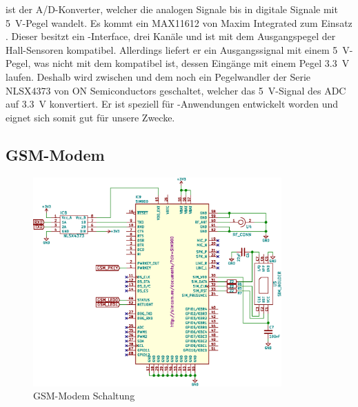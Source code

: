    ist    der   A/D-Konverter,   welcher   die    analogen   Signale
 bis  in  digitale Signale mit \SI{5}{\volt}-Pegel
wandelt. Es   kommt   ein   MAX11612   von  Maxim   Integrated   zum   Einsatz
\cite{datasheet:adc}. Dieser besitzt ein \ISC-Interface, drei Kan\"ale und ist
mit  dem  Ausgangspegel  der  Hall-Sensoren  kompatibel.   Allerdings  liefert
er  ein  Ausgangssignal  mit  einem \SI{5}{\volt}-Pegel,  was  nicht  mit  dem
\Raspi  kompatibel  ist, dessen  Eing\"ange  mit  einem Pegel  \SI{3.3}{\volt}
laufen. Deshalb wird zwischen  und  dem \Raspi noch ein Pegelwandler
der   Serie   NLSX4373  von   ON   Semiconductors   geschaltet,  welcher   das
\SI{5}{\volt}-Signal des ADC auf  \SI{3.3}{\volt} konvertiert. Er ist speziell
f\"ur  \ISC-Anwendungen entwickelt  worden  und eignet  sich  somit gut  f\"ur
unsere Zwecke.


\clearpage
\subsection{GSM-Modem}
\label{subsec:hw:master:gsm}

\begin{figure}[h!t]
    \centering
    \includegraphics[width=0.85\textwidth]{images/superv-sch/supervisor--sch--gsm.eps}
    \caption[\Master: Schema GSM-Modem]{GSM-Modem Schaltung}
    \label{fig:sch:master:gsm}
\end{figure}


